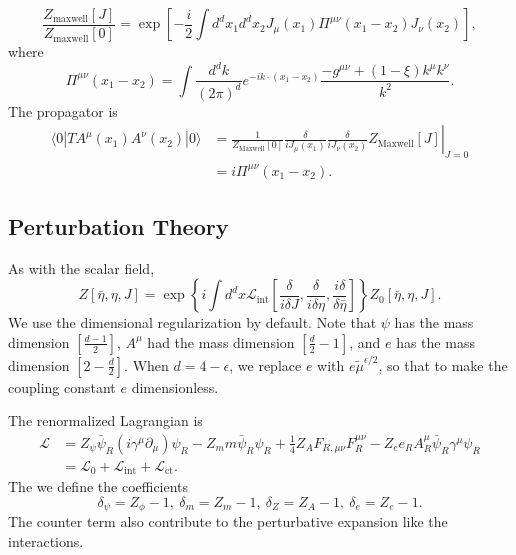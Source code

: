 \begin{equation}
	\frac{Z_{\mathrm{maxwell}}[J]}{Z_{\mathrm{maxwell}}[0]}
	= \exp\left[-\frac{i}{2}\int d^dx_1 d^dx_2 J_\mu(x_1) \Pi^{\mu\nu}(x_1-x_2) J_\nu(x_2) \right],
\end{equation}
where
\begin{equation}
	\Pi^{\mu\nu}(x_1-x_2) = \int \frac{d^d k}{(2\pi)^d} e^{-ik\cdot(x_1-x_2)}\frac{-g^{\mu\nu}+(1-\xi)k^\mu k^\nu}{k^2}.
\end{equation}
The propagator is
\begin{equation}
\begin{aligned}
	\langle 0|T A^\mu(x_1) A^\nu(x_2) |0\rangle
	&= \left.\frac{1}{Z_{\mathrm{Maxwell}}[0]}\frac{\delta}{iJ_\mu(x_1)}\frac{\delta}{iJ_\nu(x_2)} Z_{\mathrm{Maxwell}}[J]\right|_{J=0} \\
	&= i\Pi^{\mu\nu}(x_1-x_2).
\end{aligned}
\end{equation}


\subsection{Perturbation Theory}
As with the scalar field, 
\begin{equation}
	Z[\bar\eta,\eta,J] = \exp\left\{i\int d^dx \mathcal{L}_{\mathrm{int}}\left[\frac{\delta}{i\delta J},\frac{\delta}{i\delta \eta},\frac{i\delta}{\delta \bar\eta}\right]\right\} Z_0[\bar\eta,\eta,J].
\end{equation}
We use the dimensional regularization by default. 
Note that $\psi$ has the mass dimension $[\frac{d-1}{2}]$, $A^\mu$ had the mass dimension $[\frac{d}{2}-1]$, and $e$ has the mass dimension $[2-\frac{d}{2}]$.
When $d=4-\epsilon$, we replace $e$ with $e \tilde{\mu}^{\epsilon/2}$, so that to make the coupling constant $e$ dimensionless.

The renormalized Lagrangian is
\begin{equation}
\begin{aligned}
	\mathcal L 
		&= Z_{\psi} \bar\psi_R(i\gamma^\mu \partial_\mu)\psi_R 
		-Z_m m \bar\psi_R\psi_R 
		+ \frac{1}{4} Z_{A} F_{R,\mu\nu}F_R^{\mu\nu} - Z_e e_R A_R^\mu \bar\psi_R\gamma^\mu \psi_R \\
		&= \mathcal{L}_0 + \mathcal{L}_{\mathrm{int}} + \mathcal{L}_{\mathrm{ct}}.
\end{aligned}
\end{equation}
The we define the coefficients
\begin{equation}
	\delta_{\psi} = Z_\phi - 1,\ 
	\delta_{m} = Z_m - 1,\ 
	\delta_Z = Z_A - 1, \ 
	\delta_e = Z_e - 1.
\end{equation}
The counter term also contribute to the perturbative expansion like the interactions.


